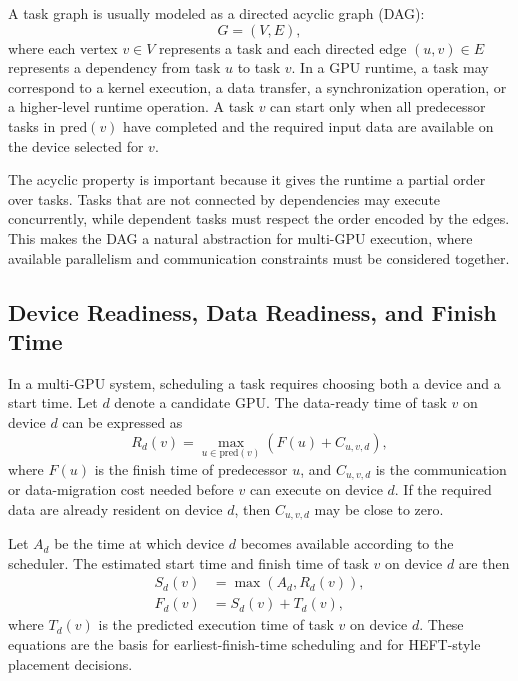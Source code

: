A task graph is usually modeled as a directed acyclic graph (DAG):
\begin{equation}
G = (V,E),
\label{eq:dag_definition}
\end{equation}
where each vertex $v \in V$ represents a task and each directed edge $(u,v) \in E$ represents a dependency from task $u$ to task $v$. In a GPU runtime, a task may correspond to a kernel execution, a data transfer, a synchronization operation, or a higher-level runtime operation. A task $v$ can start only when all predecessor tasks in $\mathrm{pred}(v)$ have completed and the required input data are available on the device selected for $v$.

The acyclic property is important because it gives the runtime a partial order over tasks. Tasks that are not connected by dependencies may execute concurrently, while dependent tasks must respect the order encoded by the edges. This makes the DAG a natural abstraction for multi-GPU execution, where available parallelism and communication constraints must be considered together.

\subsection{Device Readiness, Data Readiness, and Finish Time}
\label{subsec:device_data_finish_time}

In a multi-GPU system, scheduling a task requires choosing both a device and a start time. Let $d$ denote a candidate GPU. The data-ready time of task $v$ on device $d$ can be expressed as
\begin{equation}
R_d(v) = \max_{u \in \mathrm{pred}(v)} \left( F(u) + C_{u,v,d} \right),
\label{eq:data_ready_time}
\end{equation}
where $F(u)$ is the finish time of predecessor $u$, and $C_{u,v,d}$ is the communication or data-migration cost needed before $v$ can execute on device $d$. If the required data are already resident on device $d$, then $C_{u,v,d}$ may be close to zero.

Let $A_d$ be the time at which device $d$ becomes available according to the scheduler. The estimated start time and finish time of task $v$ on device $d$ are then
\begin{align}
S_d(v) &= \max\left(A_d, R_d(v)\right),
\label{eq:start_time}\\
F_d(v) &= S_d(v) + T_d(v),
\label{eq:finish_time}
\end{align}
where $T_d(v)$ is the predicted execution time of task $v$ on device $d$. These equations are the basis for earliest-finish-time scheduling and for HEFT-style placement decisions.

